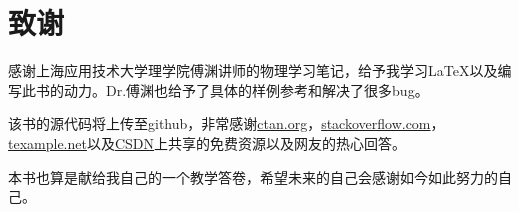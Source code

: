
\chapter{致谢}
\label{ch:acknowledgements}

感谢上海应用技术大学理学院傅渊讲师的物理学习笔记，给予我学习\LaTeX 以及编写此书的动力。Dr.傅渊也给予了具体的样例参考和解决了很多bug。

该书的源代码将上传至github，非常感谢\href{https://www.ctan.org}{ctan.org}，\href{https://www.stackoverflow.com}{stackoverflow.com}，\href{https://texample.net/tikz/examples/}{texample.net}以及\href{https://www.csdn.net}{CSDN}上共享的免费资源以及网友的热心回答。

本书也算是献给我自己的一个教学答卷，希望未来的自己会感谢如今如此努力的自己。